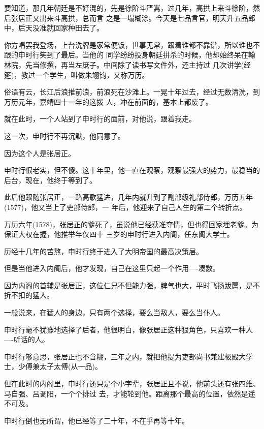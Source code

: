 \documentclass[11pt,a4paper,onecolumn]{article}
\begin{document}
要知道，那几年朝廷是不好混的，先是徐阶斗严嵩，过几年，高拱上来斗徐阶，然后张居正又出来斗高拱，总而言
之是一塌糊涂。今天是七品言官，明天升五品郎中，后天没准就回家种田去了。

你方唱罢我登场，上台洗牌是家常便饭，世事无常，跟着谁都不靠谱，所以谁也不跟的申时行笑到了最后。当他的
同学纷纷投身朝廷拼杀的时候，他却始终呆在翰林院，先当修撰，再当左庶子。中间除了读书写文件外，还主持过
几次讲学(经筵)，教过一个学生，叫做朱翊钧，又称万历。

俗语有云，长江后浪推前浪，前浪死在沙滩上。一晃十年过去，经过无数清洗，到万历元年，嘉靖四十一年的这拨
人，冲在前面的，基本上都废了。

就在此时，一个人站到了申时行的面前，对他说，跟着我走。

这一次，申时行不再沉默，他同意了。

因为这个人是张居正。

申时行很老实，但不傻。这十年里，他一直在观察，观察最强大的势力，最稳当的后台，现在，他终于等到了。

此后他跟随张居正，一路高歌猛进，几年内就升到了副部级礼部侍郎，万历五年(1577)，他又当上了吏部侍郎，一
年后，他迎来了自己人生的第二个转折点。

万历六年(1578)，张居正的爹死了，虽说他已经获准夺情，但也得回家埋老爹。为保证大权在握，他推举年仅四十
三岁的申时行进入内阁，任东阁大学士。

历经十几年的苦熬，申时行终于进入了大明帝国的最高决策层。

但是当他进入内阁后，他才发现，自己在这里只起一个作用----凑数。

因为内阁的首辅是张居正，这位仁兄不但能力强，脾气也大，平时飞扬跋扈，是不折不扣的猛人。

一般说来，在猛人的身边，只有两个选择，要么当敌人，要么当仆人。

申时行毫不犹豫地选择了后者，他很明白，像张居正这种狠角色，只喜欢一种人----听话的人。

申时行够意思，张居正也不含糊，三年之内，就把他提为吏部尚书兼建极殿大学士，少傅兼太子太傅(从一品)。

但在此时的内阁里，申时行还只是个小字辈，张居正且不说，他前头还有张四维、马自强、吕调阳，一个个排过
去，才能轮到他。距离那个最高的位置，依然是遥不可及。

申时行倒也无所谓，他已经等了二十年，不在乎再等十年。

\section[\thesection]{}
\end{document}
